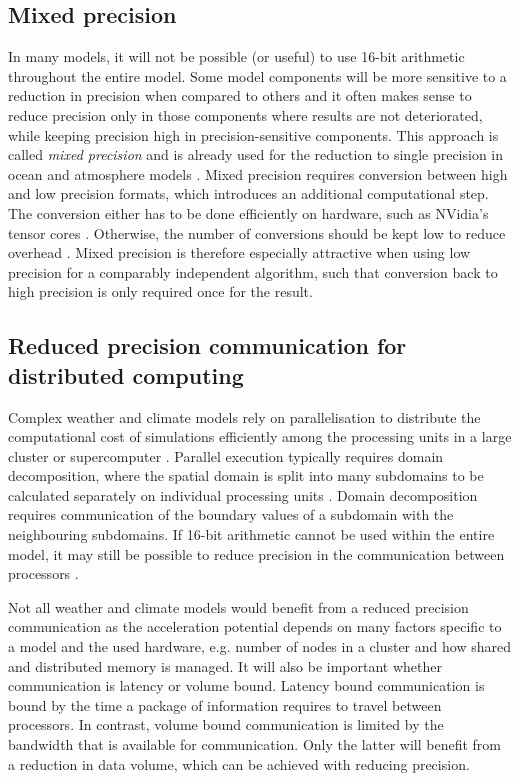 \subsection{Mixed precision}
\label{sec:swm_mixed}

In many models, it will not be possible (or useful) to use 16-bit arithmetic throughout the entire model. Some model components
will be more sensitive to a reduction in precision when compared to others and it often makes sense to reduce precision only in
those components where results are not deteriorated, while keeping precision high in precision-sensitive components. This approach
is called \emph{mixed precision} and is already used for the reduction to single precision in ocean and atmosphere models 
\citep{Vana2017,TintoPrims2019}. Mixed precision requires conversion between high and low precision formats, which introduces
an additional computational step. The conversion either has to be done efficiently on hardware, such as NVidia's tensor cores
\citep{Hatfield2019,Haidar2018}. Otherwise, the number of conversions should be kept low to reduce overhead \citep{Higham2019}.
Mixed precision is therefore especially attractive when using low precision for a comparably independent algorithm, such that
conversion back to high precision is only required once for the result.

\subsection{Reduced precision communication for distributed computing}
\label{sec:swm_comm}

Complex weather and climate models rely on parallelisation to distribute the computational cost of simulations efficiently among
the processing units in a large cluster or supercomputer \citep{Fuhrer2018}. Parallel execution typically requires domain
decomposition, where the spatial domain is split into many subdomains to be calculated separately on individual processing units
\citep{Chan1994,Toselli2004}. Domain decomposition requires communication of the boundary values of a subdomain with the
neighbouring subdomains. If 16-bit arithmetic cannot be used within the entire model, it may still be possible to reduce precision
in the communication between processors \citep{Fan2019}.

Not all weather and climate models would benefit from a reduced precision communication as the acceleration potential depends
on many factors specific to a model and the used hardware, e.g. number of nodes in a cluster and how shared and distributed
memory is managed. It will also be important whether communication is latency or volume bound. Latency bound communication
is bound by the time a package of information requires to travel between processors. In contrast, volume bound communication
is limited by the bandwidth that is available for communication. Only the latter will benefit from a reduction in data volume, which
can be achieved with reducing precision.

